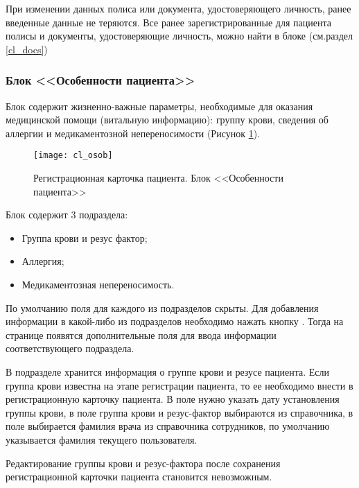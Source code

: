 \begin{prim}
При изменении данных полиса или документа, удостоверяющего личность, ранее введенные данные не теряются. Все ранее зарегистрированные для пациента полисы  и документы, удостоверяющие личность, можно найти в блоке  (см.раздел \ref{cl_docs})
\end{prim}

\subsubsection{Блок <<Особенности пациента>>} 

Блок  содержит жизненно-важные параметры, необходимые для оказания медицинской помощи (витальную информацию): группу крови, сведения об аллергии и медикаментозной непереносимости (Рисунок \ref{img_cl_osob}). 

\begin{figure}[ht]\centering
 \texttt{[image: cl\_osob]}
 \caption{Регистрационная карточка пациента. Блок <<Особенности пациента>>}
 \label{img_cl_osob}
\end{figure} 

Блок содержит 3 подраздела: 
\begin{itemize}
 \item Группа крови и резус фактор;
 \item Аллергия;
 \item Медикаментозная непереносимость.
\end{itemize}

По умолчанию поля для каждого из подразделов скрыты. Для добавления информации в какой-либо из подразделов необходимо нажать кнопку . Тогда на странице появятся дополнительные поля для ввода информации соответствующего подраздела.

В подразделе  хранится информация о группе крови  и резусе пациента. Если группа крови известна на этапе регистрации пациента, то ее необходимо внести в регистрационную карточку пациента. В поле  нужно указать дату установления группы крови, в поле  группа крови и резус-фактор выбираются из справочника, в поле  выбирается фамилия врача из справочника сотрудников, по умолчанию указывается фамилия текущего пользователя.

\begin{vnim}
Редактирование группы крови и резус-фактора после сохранения регистрационной карточки пациента становится невозможным.
\end{vnim}

